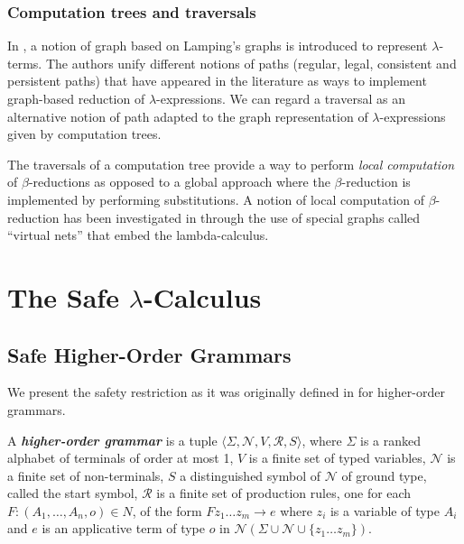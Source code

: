 \documentclass{llncs}
\newcommand\defname[1]{{\bf\em #1}\index{#1}}
\newcommand\union{\cup}
\begin{document}
\subsubsection{Computation trees and traversals}

In \cite{DBLP:conf/lics/AspertiDLR94}, a notion of graph based on
Lamping's graphs \cite{lamping} is introduced to represent
$\lambda$-terms. The authors unify different notions of paths
(regular, legal, consistent and persistent paths) that have appeared
in the literature as ways to implement graph-based reduction of
$\lambda$-expressions. We can regard a traversal as an alternative
notion of path adapted to the graph representation of
$\lambda$-expressions given by computation trees.

The traversals of a computation tree provide a way
to perform \emph{local computation} of $\beta$-reductions as opposed
to a global approach where the $\beta$-reduction is implemented by
performing substitutions. A notion of local computation of
$\beta$-reduction has been investigated in
\cite{DanosRegnier-Localandasynchronou} through the use of special
graphs called ``virtual nets'' that embed the lambda-calculus.


\section{The Safe $\lambda$-Calculus}

\subsection{Safe Higher-Order Grammars}
We present the safety restriction as it was originally defined in \cite{KNU02} for higher-order grammars.

\begin{definition}
A \defname{higher-order grammar} is a tuple $\langle \Sigma, \mathcal{N}, V, \mathcal{R}, S \rangle$, where
 $\Sigma$ is a ranked alphabet of terminals of order at most 1,
 $V$ is a finite set of typed variables,
 $\mathcal{N}$ is a finite set of non-terminals,
 $S$ a distinguished symbol of $\mathcal{N}$ of ground type, called the start symbol,
 $\mathcal{R}$ is a finite set of production rules, one for each $F : (A_1, \ldots, A_n, o) \in N$, of the form
$ F z_1 \ldots z_m \rightarrow e$
where $z_i$ is a variable of type $A_i$ and $e$ is an applicative
term of type $o$ in $\mathcal{N}(\Sigma \union \mathcal{N} \union
\{z_1 \ldots z_m \} )$.
\end{definition}
\end{document}
